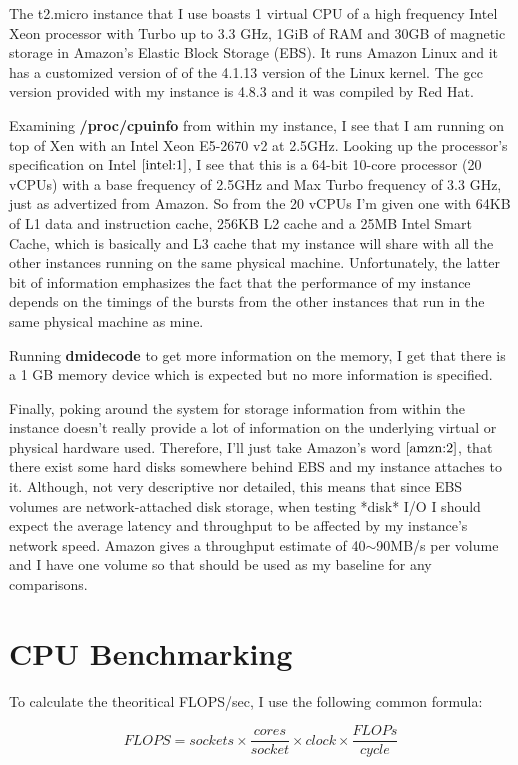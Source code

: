 \documentclass[12pt]{article}
\begin{document}
The t2.micro instance that I use boasts 1 virtual
CPU of a high frequency Intel Xeon processor with Turbo up
to 3.3 GHz, 1GiB of RAM and 30GB of magnetic storage in
Amazon's Elastic Block Storage (EBS). It runs Amazon Linux
and it has a customized version of of the 4.1.13 version
of the Linux kernel. The gcc version provided with my instance
is 4.8.3 and it was compiled by Red Hat.

Examining \textbf{/proc/cpuinfo} from within my instance, I see that
I am running on top of Xen with an Intel Xeon E5-2670 v2 at
2.5GHz. Looking up the processor's specification on Intel
$\cite{intel:1}$, I see that this is a 64-bit 10-core processor (20 vCPUs)
with a base frequency of 2.5GHz and Max Turbo frequency
of 3.3 GHz, just as advertized from Amazon. So from the
20 vCPUs I'm given one with 64KB of L1 data and instruction
cache, 256KB L2 cache and a 25MB Intel Smart Cache, which is
basically and L3 cache that my instance will share with
all the other instances running on the same physical
machine. Unfortunately, the latter bit of information
emphasizes the fact that the performance of my instance
depends on the timings of the bursts from the other instances
that run in the same physical machine as mine.

Running \textbf{dmidecode} to get more information on the memory,
I get that there is a 1 GB memory device which is expected
but no more information is specified.

Finally, poking around the system for storage information
from within the instance doesn't really provide a lot of
information on the underlying virtual or physical hardware
used. Therefore, I'll just take Amazon's word $\cite{amzn:2}$, that
there exist some hard disks somewhere behind EBS and my
instance attaches to it. Although, not very descriptive
nor detailed, this means that since EBS volumes are
network-attached disk storage, when testing *disk* I/O
I should expect the average latency and throughput to be
affected by my instance's network speed. Amazon gives a
throughput estimate of 40$\sim$90MB/s per volume and I have
one volume so that should be used as my baseline for
any comparisons.

\section{CPU Benchmarking}

To calculate the theoritical FLOPS/sec, I use the following
common formula:

\[FLOPS = sockets \times \frac{cores}{socket} \times clock \times \frac{FLOPs}{cycle}\]
\end{document}
